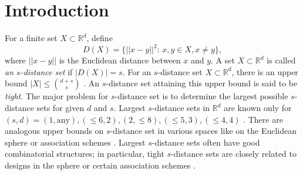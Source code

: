\documentclass[a4paper, 11pt]{article}
\newcommand{\R}{\mathbb{R}}
\theoremstyle{definition}
\begin{document}
\section{Introduction}
For a finite set $X \subset \mathbb{R}^d$, define
\[
D(X)=\{||x-y||^2 \colon\, x,y \in X, x \ne y\},
\]
where $||x-y||$ is the Euclidean distance between $x$ and $y$. 
A set $X \subset \mathbb{R}^d$ is called {\it an $s$-distance set} if $|D(X)|=s$. For an $s$-distance set $X \subset \R^d$, there is an upper bound $|X| \leq \binom{d+s}{s}$ \cite{BBS83}. 
An $s$-distance set attaining this upper bound is said to be {\it tight}. 
The major problem for $s$-distance set is to determine the largest possible $s$-distance sets for given $d$ and $s$. 
Largest $s$-distance sets in $\mathbb{R}^d$ are known only for $(s, d) = (1, \text{any}),(\leq 6, 2),(2, \leq 8),( \leq 5,3),( \leq 4,4)$ \cite{ES66,EF96,L97,NS21,S04,S08,Spre,SO20,W12}. 
There are analogous upper bounds on $s$-distance set in various spaces like on the Euclidean sphere \cite{DGS77} or association schemes \cite{BIb,D73}. 
Largest $s$-distance sets often have good combinatorial structures; in particular, tight $s$-distance sets are closely related to designs in the sphere or certain association schemes \cite{D73,DGS77}. 
\end{document}
